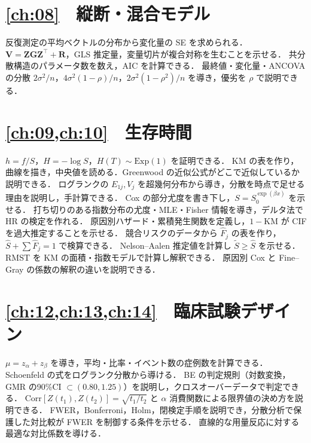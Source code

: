 \documentclass[a4paper,11pt,openany]{ltjsbook}
\newcommand{\Corr}{\mathrm{Corr}}
\newcommand{\Ex}{\mathrm{Exp}}
\newcommand{\transp}{^{\top}}
\begin{document}
\section*{\cref{ch:08}　縦断・混合モデル}
\begin{itemize}
\chk 反復測定の平均ベクトルの分布から変化量の SE を求められる．
\chk $\bm V=\bm Z\bm G\bm Z\transp+\bm R$，GLS 推定量，変量切片が複合対称を生むことを示せる．
\chk 共分散構造のパラメータ数を数え，AIC を計算できる．
\chk 最終値・変化量・ANCOVA の分散 $2\sigma^2/n$，$4\sigma^2(1-\rho)/n$，$2\sigma^2(1-\rho^2)/n$ を導き，優劣を $\rho$ で説明できる．
\end{itemize}
\section*{\cref{ch:09,ch:10}　生存時間}
\begin{itemize}
\chk $h=f/S$，$H=-\log S$，$H(T)\sim\Ex(1)$ を証明できる．
\chk KM の表を作り，曲線を描き，中央値を読める．Greenwood の近似公式がどこで近似しているか説明できる．
\chk ログランクの $E_{1j},V_j$ を超幾何分布から導き，分散を時点で足せる理由を説明し，手計算できる．
\chk Cox の部分尤度を書き下し，$S=S_0^{\exp(\beta x)}$ を示せる．
\chk 打ち切りのある指数分布の尤度・MLE・Fisher 情報を導き，デルタ法で HR の検定を作れる．
\chk 原因別ハザード・累積発生関数を定義し，$1-$KM が CIF を過大推定することを示せる．
\chk 競合リスクのデータから $\hat F_j$ の表を作り，$\hat S+\sum\hat F_j=1$ で検算できる．
\chk Nelson--Aalen 推定値を計算し $\tilde S\ge\hat S$ を示せる．RMST を KM の面積・指数モデルで計算し解釈できる．
\chk 原因別 Cox と Fine--Gray の係数の解釈の違いを説明できる．
\end{itemize}
\section*{\cref{ch:12,ch:13,ch:14}　臨床試験デザイン}
\begin{itemize}
\chk $\mu=z_\alpha+z_\beta$ を導き，平均・比率・イベント数の症例数を計算できる．
\chk Schoenfeld の式をログランク分散から導ける．
\chk BE の判定規則（対数変換，GMR の90\%CI $\subset(0.80,1.25)$）を説明し，クロスオーバーデータで判定できる．
\chk $\Corr[Z(t_1),Z(t_2)]=\sqrt{t_1/t_2}$ と $\alpha$ 消費関数による限界値の決め方を説明できる．
\chk FWER，Bonferroni，Holm，閉検定手順を説明でき，分散分析で保護した対比較が FWER を制御する条件を示せる．
\chk 直線的な用量反応に対する最適な対比係数を導ける．
\end{itemize}
\end{document}
